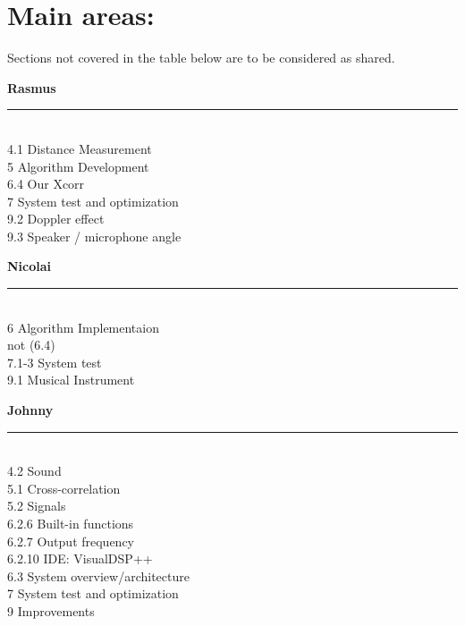\section{Main areas:}
Sections not covered in the table below are to be considered as shared.
\begin{minipage}{0.31\columnwidth}
\begin{center}
\textbf{Rasmus}
\end{center}
\hrule
\ \\
4.1 Distance Measurement\\
5 Algorithm Development\\
6.4 Our Xcorr\\
7 System test and optimization\\
9.2 Doppler effect\\
9.3 Speaker / microphone angle\\
\end{minipage}
\hfill
\vline
\hfill
\begin{minipage}{0.31\columnwidth}
\begin{center}
\textbf{Nicolai}
\end{center}
\hrule
\ \\
6 Algorithm Implementaion\\
 not (6.4)\\
7.1-3 System test\\
9.1 Musical Instrument\\
\end{minipage}
\hfill
\vline
\hfill
\begin{minipage}{0.31\columnwidth}
\begin{center}
\textbf{Johnny}
\end{center}
\hrule
\ \\
4.2 Sound\\
5.1 Cross-correlation\\
5.2 Signals\\
6.2.6 Built-in functions\\
6.2.7 Output frequency\\
6.2.10 IDE: VisualDSP++\\
6.3 System overview/architecture\\
7 System test and optimization\\
9 Improvements\\
\end{minipage}